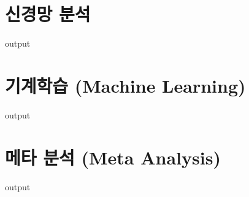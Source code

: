 \documentclass{book}
\begin{document}
\section{신경망 분석}
\begin{Schunk}
\begin{Soutput}
output
\end{Soutput}
\end{Schunk}

\section{기계학습 (Machine Learning)}
\begin{Schunk}
\begin{Soutput}
output
\end{Soutput}
\end{Schunk}

\section{메타 분석 (Meta Analysis)}
\begin{Schunk}
\begin{Soutput}
output
\end{Soutput}
\end{Schunk}


%
%
%
\end{document}
